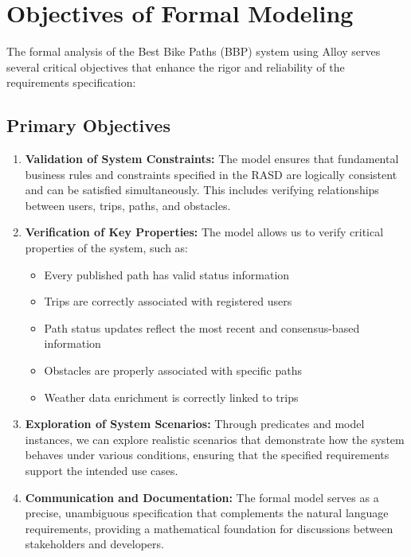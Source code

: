 \section{Objectives of Formal Modeling}
\label{sec:objectives_formal_modeling}%

The formal analysis of the Best Bike Paths (BBP) system using Alloy serves several critical objectives that enhance the rigor and reliability of the requirements specification:

\subsection{Primary Objectives}
\label{subsec:primary_objectives}%

\begin{enumerate}
    \item \textbf{Validation of System Constraints:} The model ensures that fundamental business rules and constraints specified in the RASD are logically consistent and can be satisfied simultaneously. This includes verifying relationships between users, trips, paths, and obstacles.
        
    \item \textbf{Verification of Key Properties:} The model allows us to verify critical properties of the system, such as:
    \begin{itemize}
        \item Every published path has valid status information
        \item Trips are correctly associated with registered users
        \item Path status updates reflect the most recent and consensus-based information
        \item Obstacles are properly associated with specific paths
        \item Weather data enrichment is correctly linked to trips
    \end{itemize}
    
    \item \textbf{Exploration of System Scenarios:} Through predicates and model instances, we can explore realistic scenarios that demonstrate how the system behaves under various conditions, ensuring that the specified requirements support the intended use cases.
    
    \item \textbf{Communication and Documentation:} The formal model serves as a precise, unambiguous specification that complements the natural language requirements, providing a mathematical foundation for discussions between stakeholders and developers.
\end{enumerate}

